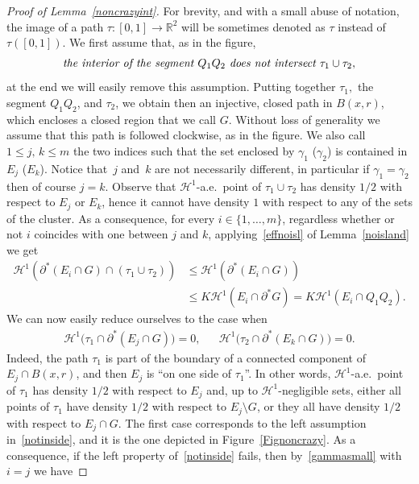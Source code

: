 \documentclass[10pt]{amsart}
\newcommand\R{\mathbb{R}}
\renewcommand\H{\mathcal{H}}
\theoremstyle{plain}
\theoremstyle{definition}
\begin{document}
\begin{proof}[Proof of Lemma~\ref{noncrazyint}]
For brevity, and with a small abuse of notation, the image of a path $\tau:[0,1]\to\R^2$ will be sometimes denoted as $\tau$ instead of $\tau([0,1])$. We first assume that, as in the figure,
\begin{equation}\label{justforasec}
\hbox{\it the interior of the segment $Q_1Q_2$ does not intersect $\tau_1\cup \tau_2$},
\end{equation}
at the end we will easily remove this assumption. Putting together $\tau_1,$ the segment $Q_1Q_2$, and $\tau_2$, we obtain then an injective, closed path in $B(x,r)$, which encloses a closed region that we call $G$. Without loss of generality we assume that this path is followed clockwise, as in the figure. We also call $1\leq j,\,k\leq m$ the two indices such that the set enclosed by $\gamma_1$ (\resp $\gamma_2$) is contained in $E_j$ (\resp $E_k$). Notice that~$j$ and~$k$ are not necessarily different, in particular if $\gamma_1=\gamma_2$ then of course $j=k$. Observe that $\H^1$-a.e.\ point of $\tau_1\cup\tau_2$ has density $1/2$ with respect to $E_j$ or $E_k$, hence it cannot have density $1$ with respect to any of the sets of the cluster. As a consequence, for every $i\in\{1,\dots,m\}$, regardless whether or not $i$ coincides with one between $j$ and $k$, applying~\eqref{effnoisl} of Lemma~\ref{noisland} we get
\begin{equation}\label{gammasmall}
\begin{split}
\H^1(\partial^* (E_i\cap G)\cap (\tau_1\cup\tau_2)) &\leq \H^1(\partial^*(E_i\cap G))\\
& \leq K \H^1(E_i\cap \partial^* G)=K \H^1(E_i\cap Q_1Q_2).
\end{split}
\end{equation}
We can now easily reduce ourselves to the case when
\begin{align}\label{notinside}
\H^1\big(\tau_1 \cap \partial^*(E_j\cap G)\big)=0, && \H^1\big(\tau_2 \cap \partial^*(E_k\cap G)\big)=0.
\end{align}
Indeed, the path $\tau_1$ is part of the boundary of a connected component of $E_j\cap B(x,r)$, and then $E_j$ is ``on one side of $\tau_1$''. In other words, $\H^1$-a.e.\ point of $\tau_1$ has density $1/2$ with respect to $E_j$ and, up to $\H^1$-negligible sets, either all points of $\tau_1$ have density $1/2$ with respect to $E_j\setminus G$, or they all have density $1/2$ with respect to $E_j\cap G$. The first case corresponds to the left assumption in~\eqref{notinside}, and it is the one depicted in Figure~\ref{Fignoncrazy}. As a consequence, if the left property of~\eqref{notinside} fails, then by~\eqref{gammasmall} with $i=j$ we have

\end{proof}
\end{document}
